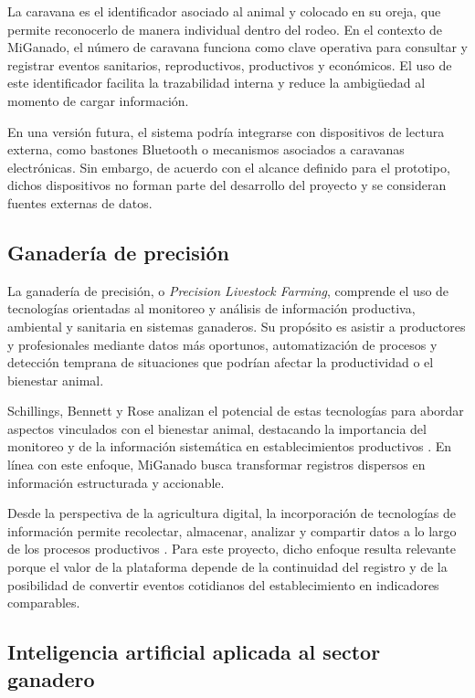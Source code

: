 La caravana es el identificador asociado al animal y colocado en su oreja, que permite reconocerlo de manera individual dentro del rodeo. En el contexto de MiGanado, el n\'umero de caravana funciona como clave operativa para consultar y registrar eventos sanitarios, reproductivos, productivos y econ\'omicos. El uso de este identificador facilita la trazabilidad interna y reduce la ambig\"uedad al momento de cargar informaci\'on.

En una versi\'on futura, el sistema podr\'ia integrarse con dispositivos de lectura externa, como bastones Bluetooth o mecanismos asociados a caravanas electr\'onicas. Sin embargo, de acuerdo con el alcance definido para el prototipo, dichos dispositivos no forman parte del desarrollo del proyecto y se consideran fuentes externas de datos.

\subsection{Ganader\'ia de precisi\'on}

La ganader\'ia de precisi\'on, o \emph{Precision Livestock Farming}, comprende el uso de tecnolog\'ias orientadas al monitoreo y an\'alisis de informaci\'on productiva, ambiental y sanitaria en sistemas ganaderos. Su prop\'osito es asistir a productores y profesionales mediante datos m\'as oportunos, automatizaci\'on de procesos y detecci\'on temprana de situaciones que podr\'ian afectar la productividad o el bienestar animal.

Schillings, Bennett y Rose analizan el potencial de estas tecnolog\'ias para abordar aspectos vinculados con el bienestar animal, destacando la importancia del monitoreo y de la informaci\'on sistem\'atica en establecimientos productivos \parencite{SchillingsBennettRose2021}. En l\'inea con este enfoque, MiGanado busca transformar registros dispersos en informaci\'on estructurada y accionable.

Desde la perspectiva de la agricultura digital, la incorporaci\'on de tecnolog\'ias de informaci\'on permite recolectar, almacenar, analizar y compartir datos a lo largo de los procesos productivos \parencite{FAO2019DigitalTechnologies}. Para este proyecto, dicho enfoque resulta relevante porque el valor de la plataforma depende de la continuidad del registro y de la posibilidad de convertir eventos cotidianos del establecimiento en indicadores comparables.

\subsection{Inteligencia artificial aplicada al sector ganadero}

